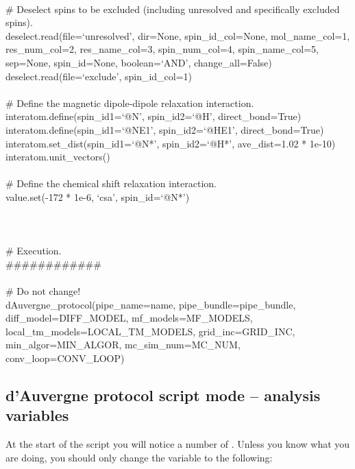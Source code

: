 \begin{htmlonly}
\begin{htmlonly}
\begin{exampleenv}
 \\
\# Deselect spins to be excluded (including unresolved and specifically excluded spins). \\
deselect.read(file=`unresolved', dir=None, spin\_id\_col=None, mol\_name\_col=1, res\_num\_col=2, res\_name\_col=3, spin\_num\_col=4, spin\_name\_col=5, sep=None, spin\_id=None, boolean=`AND', change\_all=False) \\
deselect.read(file=`exclude', spin\_id\_col=1) \\
 \\
\# Define the magnetic dipole-dipole relaxation interaction. \\
interatom.define(spin\_id1=`@N', spin\_id2=`@H', direct\_bond=True) \\
interatom.define(spin\_id1=`@NE1', spin\_id2=`@HE1', direct\_bond=True) \\
interatom.set\_dist(spin\_id1=`@N*', spin\_id2=`@H*', ave\_dist=1.02 * 1e-10) \\
interatom.unit\_vectors() \\
 \\
\# Define the chemical shift relaxation interaction. \\
value.set(-172 * 1e-6, `csa', spin\_id=`@N*') \\
 \\
 \\
 \\
\# Execution. \\
\#\#\#\#\#\#\#\#\#\#\#\# \\
 \\
\# Do not change! \\
dAuvergne\_protocol(pipe\_name=name, pipe\_bundle=pipe\_bundle, diff\_model=DIFF\_MODEL, mf\_models=MF\_MODELS, local\_tm\_models=LOCAL\_TM\_MODELS, grid\_inc=GRID\_INC, min\_algor=MIN\_ALGOR, mc\_sim\_num=MC\_NUM, conv\_loop=CONV\_LOOP) \\
\end{exampleenv}



\subsection{d'Auvergne protocol script mode -- analysis variables} \label{sect: d'Auvergne protocol script variables}

At the start of the script you will notice a number of .  Unless you know what you are doing, you should only change the  variable to the following:


\end{htmlonly}
\end{htmlonly}

